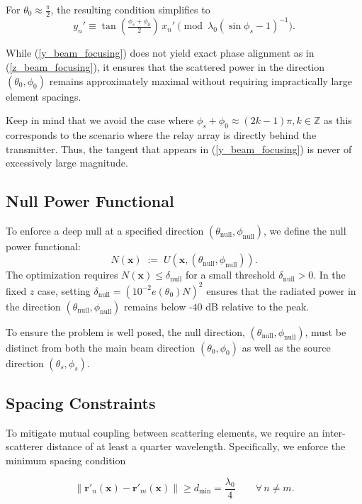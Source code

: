\documentclass[11pt,letterpaper]{article}
\theoremstyle{definition}
\theoremstyle{plain}
\begin{document}
For $\theta_0 \approx \tfrac{\pi}{2}$, the resulting condition simplifies to
\begin{equation}
\label{y_beam_focusing}
y_n' \equiv  
\tan\!\left(\tfrac{\phi_s+\phi_0}{2}\right)\,x_n' 
\pmod{\lambda_0 (\sin\phi_s - 1)^{-1}}.
\end{equation}

While (\ref{y_beam_focusing}) does not yield exact phase alignment as in (\ref{z_beam_focusing}), it ensures that the scattered power in the direction $(\theta_0,\phi_0)$ remains approximately maximal without requiring impractically large element spacings.

Keep in mind that we avoid the case where $\phi_s + \phi_0 \approx (2k-1)\pi, k\in\mathbb{Z}$ as this corresponds to the scenario where the relay array is directly behind the transmitter. Thus, the tangent that appears in (\ref{y_beam_focusing}) is never of excessively large magnitude.

\subsection{ Null Power Functional}
To enforce a deep null at a specified direction $(\theta_{\text{null}},\phi_{\text{null}})$, we define the null power functional:
\[
N(\bm x) \;:=\; U\!\left(\bm x,(\theta_{\text{null}},\phi_{\text{null}})\right).
\]
The optimization requires $N(\bm x) \leq \delta_{\text{null}}$ for a small threshold $\delta_{\text{null}}>0$. In the fixed $z$ case, setting $\delta_{\text{null}} = \left(10^{-2}e(\theta_0)N \right)^2$ ensures that the radiated power in the direction $(\theta_{\text{null}},\phi_{\text{null}})$ remains below -$40$ dB relative to the peak. 

To ensure the problem is well posed, the null direction, $(\theta_{\text{null}},\phi_{\text{null}})$, must be distinct from both the main beam direction $ (\theta_0, \phi_0)$ as well as the source direction $(\theta_s, \phi_s)$.

\subsection{Spacing Constraints}
\label{spacingcon}
To mitigate mutual coupling between scattering elements, we require an inter-scatterer distance of at least a quarter wavelength. Specifically, we enforce the minimum spacing condition

\[
\|\mathbf{r}'_n(\mathbf{x})-\mathbf{r}'_m(\mathbf{x})\| \ge d_{\min} = \frac{\lambda_0}{4} \qquad \forall\, n \neq m.
\]
\end{document}
